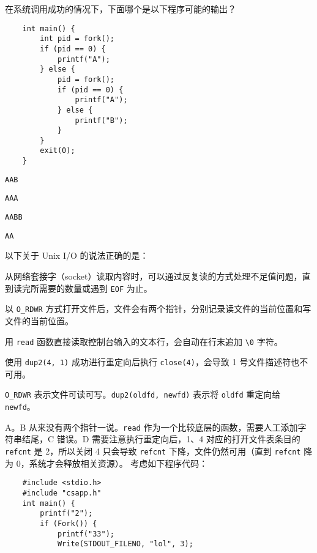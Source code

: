 \begin{problems}
\begin{choices}
        \end{choices}
         在系统调用成功的情况下，下面哪个是以下程序可能的输出？
        \begin{verbatim}
    int main() {
        int pid = fork();
        if (pid == 0) {
            printf("A");
        } else {
            pid = fork();
            if (pid == 0) {
                printf("A");
            } else {
                printf("B");
            }
        }
        exit(0);
    }
        \end{verbatim}
        \begin{choices}
            \item \verb|AAB|
            \item \verb|AAA|
            \item \verb|AABB|
            \item \verb|AA|
        \end{choices}
         以下关于 Unix I/O 的说法正确的是：
        \begin{choices}
            \item 从网络套接字（socket）读取内容时，可以通过反复读的方式处理不足值问题，直到读完所需要的数量或遇到 \verb|EOF| 为止。
            \item 以 \verb|O_RDWR| 方式打开文件后，文件会有两个指针，分别记录读文件的当前位置和写文件的当前位置。
            \item 用 \verb|read| 函数直接读取控制台输入的文本行，会自动在行末追加 \verb|\0| 字符。
            \item 使用 \verb|dup2(4, 1)| 成功进行重定向后执行 \verb|close(4)|，会导致 1 号文件描述符也不可用。
        \end{choices}
        \begin{hint}
            \verb|O_RDWR| 表示文件可读可写。\verb|dup2(oldfd, newfd)| 表示将 \verb|oldfd| 重定向给 \verb|newfd|。
        \end{hint}
        \sol A。B 从来没有两个指针一说。\verb|read| 作为一个比较底层的函数，需要人工添加字符串结尾，C 错误。D 需要注意执行重定向后，1、4 对应的打开文件表条目的 \verb|refcnt| 是 2，所以关闭 4 只会导致 \verb|refcnt| 下降，文件仍然可用（直到 \verb|refcnt| 降为 0，系统才会释放相关资源）。
         考虑如下程序代码：
        \begin{verbatim}
    #include <stdio.h>
    #include "csapp.h"
    int main() {
        printf("2");
        if (Fork()) {
            printf("33");
            Write(STDOUT_FILENO, "lol", 3);

\end{verbatim}
\end{problems}
